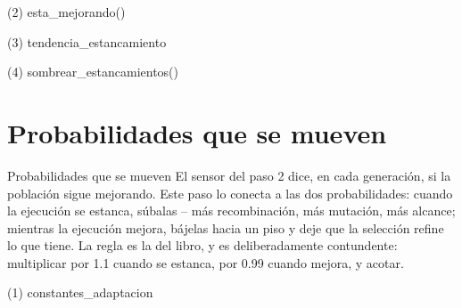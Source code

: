 \begin{frame}[fragile]{(2) esta\_mejorando()}

\end{frame}

\begin{frame}[fragile]{(3) tendencia\_estancamiento}

\end{frame}

\begin{frame}[fragile]{(4) sombrear\_estancamientos()}

\end{frame}


\section{Probabilidades que se mueven}

\begin{frame}{Probabilidades que se mueven}
El sensor del paso 2 dice, en cada generación, si la población sigue
mejorando. Este paso lo conecta a las dos probabilidades: cuando la ejecución se estanca,
súbalas -- más recombinación, más mutación, más alcance; mientras la ejecución
mejora, bájelas hacia un piso y deje que la selección refine lo que tiene.
La regla es la del libro, y es deliberadamente contundente: multiplicar por 1.1 cuando
se estanca, por 0.99 cuando mejora, y acotar.
\end{frame}

\begin{frame}[fragile]{(1) constantes\_adaptacion}

\end{frame}

